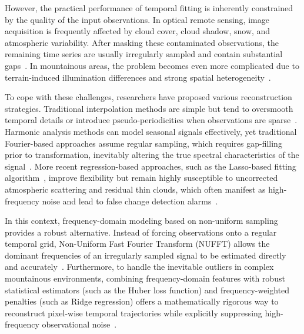 \documentclass[letterpaper,journal]{IEEEtran}
\begin{document}
However, the practical performance of temporal fitting is inherently constrained by the quality of the input observations. In optical remote sensing, image acquisition is frequently affected by cloud cover, cloud shadow, snow, and atmospheric variability. After masking these contaminated observations, the remaining time series are usually irregularly sampled and contain substantial gaps~\cite{ref3}. In mountainous areas, the problem becomes even more complicated due to terrain-induced illumination differences and strong spatial heterogeneity~\cite{ref13}.

To cope with these challenges, researchers have proposed various reconstruction strategies. Traditional interpolation methods are simple but tend to oversmooth temporal details or introduce pseudo-periodicities when observations are sparse~\cite{ref4}. Harmonic analysis methods can model seasonal signals effectively, yet traditional Fourier-based approaches assume regular sampling, which requires gap-filling prior to transformation, inevitably altering the true spectral characteristics of the signal~\cite{ref5}. More recent regression-based approaches, such as the Lasso-based fitting algorithm~\cite{ref14}, improve flexibility but remain highly susceptible to uncorrected atmospheric scattering and residual thin clouds, which often manifest as high-frequency noise and lead to false change detection alarms~\cite{ref7}.

In this context, frequency-domain modeling based on non-uniform sampling provides a robust alternative. Instead of forcing observations onto a regular temporal grid, Non-Uniform Fast Fourier Transform (NUFFT) allows the dominant frequencies of an irregularly sampled signal to be estimated directly and accurately~\cite{ref6}. Furthermore, to handle the inevitable outliers in complex mountainous environments, combining frequency-domain features with robust statistical estimators (such as the Huber loss function) and frequency-weighted penalties (such as Ridge regression) offers a mathematically rigorous way to reconstruct pixel-wise temporal trajectories while explicitly suppressing high-frequency observational noise~\cite{ref8,ref9}.
\end{document}
